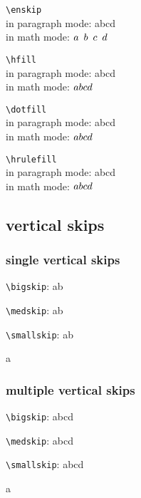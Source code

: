 \documentclass{article}
\begin{document}
\noindent \verb+\enskip+ \\
in paragraph mode: a\enskip{}b\enskip{}c\enskip{}d \\
in math mode: $a\enskip{}b\enskip{}c\enskip{}d$

\noindent \verb+\hfill+ \\
in paragraph mode: a\hfill{}b\hfill{}c\hfill{}d \\
in math mode: $a\hfill{}b\hfill{}c\hfill{}d$

\noindent \verb+\dotfill+ \\
in paragraph mode: a\dotfill{}b\dotfill{}c\dotfill{}d \\
in math mode: $a\dotfill{}b\dotfill{}c\dotfill{}d$

\noindent \verb+\hrulefill+ \\
in paragraph mode: a\hrulefill{}b\hrulefill{}c\hrulefill{}d \\
in math mode: $a\hrulefill{}b\hrulefill{}c\hrulefill{}d$

\subsection{vertical skips}
\subsubsection{single vertical skips}
\noindent
\verb+\bigskip+: a\bigskip{}b

\noindent
\verb+\medskip+: a\medskip{}b

\noindent
\verb+\smallskip+: a\smallskip{}b

\noindent
a

\subsubsection{multiple vertical skips}
\noindent
\verb+\bigskip+: a\bigskip{}b\bigskip{}c\bigskip{}d

\noindent
\verb+\medskip+: a\medskip{}b\medskip{}c\medskip{}d

\noindent
\verb+\smallskip+: a\smallskip{}b\smallskip{}c\smallskip{}d

\noindent
a
\end{document}
